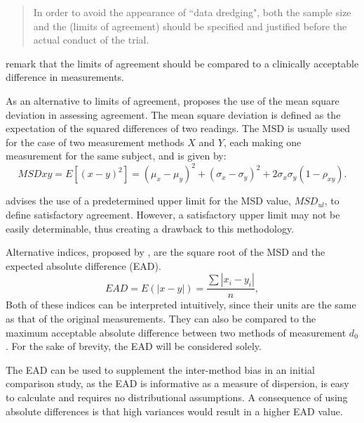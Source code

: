 \documentclass[12pt, a4paper]{report}
\theoremstyle{plain}
\theoremstyle{definition}
\theoremstyle{remark}
\begin{document}
	\begin{quote}
		In order to avoid the appearance of ``data dredging", both the
		sample size and the (limits of agreement) should be specified and
		justified before the actual conduct of the trial. \citep{lin}
	\end{quote}
	
	\citet{Dewitte} remark that the limits of agreement should be
	compared to a clinically acceptable difference in measurements.
	
	As an alternative to limits of agreement, \citet{lin2002} proposes the use of
	the mean square deviation in assessing agreement. The mean square
	deviation is defined as the expectation of the squared differences
	of two readings. The MSD is usually used for the case of two
	measurement methods $X$ and $Y$, each making one measurement for
	the same subject, and is given by:
	\[
	MSDxy = E[(x - y)^2]  = (\mu_{x} - \mu_{y})^2 + (\sigma_{x} -
	\sigma_{y})^2 + 2\sigma_{x}\sigma_{y}(1-\rho_{xy}).
	\]
	
	
	\citet{Barnhart} advises the use of a predetermined upper limit
	for the MSD value, $MSD_{ul}$, to define satisfactory agreement.
	However, a satisfactory upper limit may not be easily
	determinable, thus creating a drawback to this methodology.
	
	
	Alternative indices, proposed by \citet{Barnhart}, are the square root of the MSD and the expected absolute difference (EAD). 
	\[
	EAD = E(|x - y|) = \frac{\sum |x_{i}- y_{i}|}{n},
	\]
	Both of these indices can be interpreted intuitively, since their units are the same as that of the original measurements. They can also be compared to the maximum acceptable absolute difference between two methods of measurement $d_{0}$. For the sake of brevity, the EAD will be considered solely.
	
	The EAD can be used to supplement the inter-method bias in an
	initial comparison study, as the EAD is informative as a measure
	of dispersion, is easy to calculate and requires no distributional
	assumptions. A consequence of using absolute differences is that high variances would result in a higher EAD value. 
	
\end{document}
